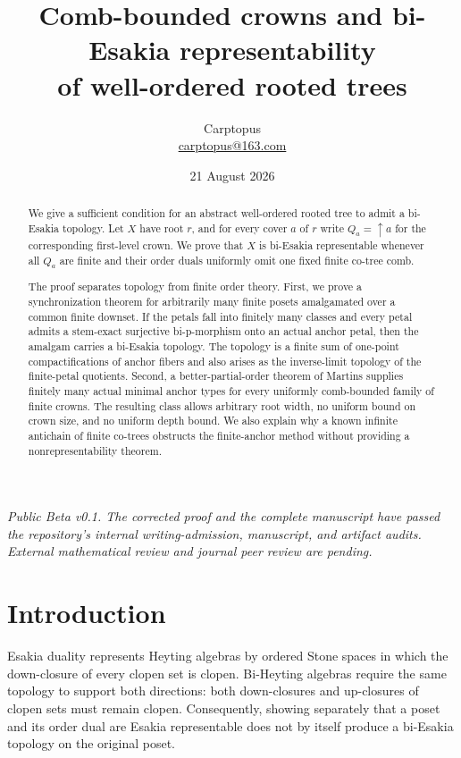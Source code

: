 \documentclass[11pt]{article}
\title{Comb-bounded crowns and bi-Esakia representability\\of well-ordered rooted trees}
\author{Carptopus\\\href{mailto:carptopus@163.com}{carptopus@163.com}}
\date{21 August 2026}
\theoremstyle{remark}
\numberwithin{equation}{section}
\begin{document}
\maketitle

\begin{center}
\small\itshape
Public Beta v0.1. The corrected proof and the complete manuscript have passed
the repository's internal writing-admission, manuscript, and artifact audits.
External mathematical review and journal peer review are pending.
\end{center}
\vspace{0.8em}

\begin{abstract}
We give a sufficient condition for an abstract well-ordered rooted tree to
admit a bi-Esakia topology. Let $X$ have root $r$, and for every cover $a$ of
$r$ write $Q_a=\uparrow a$ for the corresponding first-level crown. We prove
that $X$ is bi-Esakia representable whenever all $Q_a$ are finite and their
order duals uniformly omit one fixed finite co-tree comb.

The proof separates topology from finite order theory. First, we prove a
synchronization theorem for arbitrarily many finite posets amalgamated over a
common finite downset. If the petals fall into finitely many classes and every
petal admits a stem-exact surjective bi-p-morphism onto an actual anchor petal,
then the amalgam carries a bi-Esakia topology. The topology is a finite sum of
one-point compactifications of anchor fibers and also arises as the
inverse-limit topology of the finite-petal quotients. Second, a
better-partial-order theorem of Martins supplies finitely many actual minimal
anchor types for every uniformly comb-bounded family of finite crowns. The
resulting class allows arbitrary root width, no uniform bound on crown size,
and no uniform depth bound. We also explain why a known infinite antichain of
finite co-trees obstructs the finite-anchor method without providing a
nonrepresentability theorem.
\end{abstract}

\section{Introduction}

Esakia duality represents Heyting algebras by ordered Stone spaces in which the
down-closure of every clopen set is clopen. Bi-Heyting algebras require the same
topology to support both directions: both down-closures and up-closures of
clopen sets must remain clopen. Consequently, showing separately that a poset
and its order dual are Esakia representable does not by itself produce a
bi-Esakia topology on the original poset.
\end{document}
